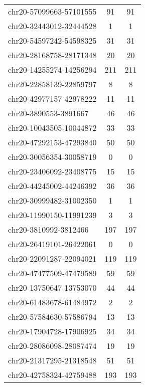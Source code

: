 \documentclass[10pt,letterpaper]{article}
\begin{document}
{\begin{longtable}{lSS}
	chr20-57099663-57101555 & 91     & 91                    \\
	chr20-32443012-32444528 & 1      & 1                     \\
	chr20-54597242-54598325 & 31     & 31                    \\
	chr20-28168758-28171348 & 20     & 20                    \\
	chr20-14255274-14256294 & 211    & 211                   \\
	chr20-22858139-22859797 & 8      & 8                     \\
	chr20-42977157-42978222 & 11     & 11                    \\
	chr20-3890553-3891667   & 46     & 46                    \\
	chr20-10043505-10044872 & 33     & 33                    \\
	chr20-47292153-47293840 & 50     & 50                    \\
	chr20-30056354-30058719 & 0      & 0                     \\
	chr20-23406092-23408775 & 15     & 15                    \\
	chr20-44245002-44246392 & 36     & 36                    \\
	chr20-30999482-31002350 & 1      & 1                     \\
	chr20-11990150-11991239 & 3      & 3                     \\
	chr20-3810992-3812466   & 197    & 197                   \\
	chr20-26419101-26422061 & 0      & 0                     \\
	chr20-22091287-22094021 & 119    & 119                   \\
	chr20-47477509-47479589 & 59     & 59                    \\
	chr20-13750647-13753070 & 44     & 44                    \\
	chr20-61483678-61484972 & 2      & 2                     \\
	chr20-57584630-57586794 & 13     & 13                    \\
	chr20-17904728-17906925 & 34     & 34                    \\
	chr20-28086098-28087474 & 19     & 19                    \\
	chr20-21317295-21318548 & 51     & 51                    \\
	chr20-42758324-42759488 & 193    & 193                   \\

\end{longtable}}
\end{document}

